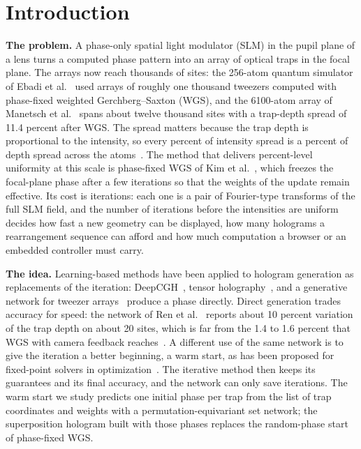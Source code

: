 \section{Introduction}\label{sec:intro}

\textbf{The problem.} A phase-only spatial light modulator (SLM) in the pupil plane of a lens turns a computed phase pattern into an array of optical traps in the focal plane. The arrays now
reach thousands of sites: the 256-atom quantum simulator of Ebadi et al.~\cite{ebadi} used arrays of roughly one thousand tweezers computed with phase-fixed weighted Gerchberg--Saxton (WGS), and
the 6100-atom array of Manetsch et al.~\cite{manetsch} spans about twelve thousand sites with a trap-depth spread of 11.4 percent after WGS. The spread matters because the trap depth is proportional to the
intensity, so every percent of intensity spread is a percent of depth spread across the atoms~\cite{grimm}. The method that delivers percent-level uniformity at this scale is phase-fixed WGS of
Kim et al.~\cite{kim2019}, which freezes the focal-plane phase after a few iterations so that the weights of the update remain effective. Its cost is iterations: each one is a
pair of Fourier-type transforms of the full SLM field, and the number of iterations before the intensities are uniform decides how fast a new geometry can be displayed, how
many holograms a rearrangement sequence can afford and how much computation a browser or an embedded controller must carry.

\textbf{The idea.} Learning-based methods have been applied to hologram generation as replacements of the iteration: DeepCGH~\cite{eybposh}, tensor holography~\cite{shi},
and a generative network for tweezer arrays~\cite{ren} produce a phase directly. Direct generation trades accuracy for speed: the network of Ren et al.~\cite{ren} reports about
10 percent variation of the trap depth on about 20 sites, which is far from the 1.4 to 1.6 percent that WGS with camera feedback reaches~\cite{kim2019,nogrette}. A different use of the same
network is to give the iteration a better beginning, a warm start, as has been proposed for fixed-point solvers in optimization~\cite{sambharya}. The iterative method then keeps
its guarantees and its final accuracy, and the network can only save iterations. The warm start we study predicts one initial phase per trap from the list of trap coordinates and weights with a
permutation-equivariant set network; the superposition hologram built with those phases replaces the random-phase start of phase-fixed WGS.

